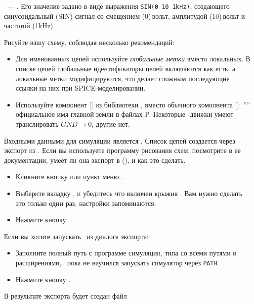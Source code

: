 \ --- . Его значение задано в
виде выражения \verb|SIN(0 10 1kHz)|, создающего синусоидальный (SIN) сигнал со
смещением (0)\,вольт, амплитудой (10)\,вольт и частотой (1kHz).

\bigskip
Рисуйте вашу схему, соблюдая несколько рекомендаций:
\begin{itemize}
  \item
Для именованных цепей используйте \emph{глобальные метки} вместо локальных.
В списке цепей глобальные идентификаторы цепей включаются как есть, а
локальные метки модифицируются, что делает сложным последующие ссылки на них при
SPICE-моделировании.
  \item
Используйте компонент [] из библиотеки , вместо обычного
комопнента []: ”” официальное имя главной земли в файлах
P\spice. Некоторые \spice-движки умеют транслировать $GND \rightarrow 0$, другие
нет.
\end{itemize}


Входными данными для симуляции является .
Список цепей создается через экспорт из \eeschema. Если
вы используете программу рисования схем, посмотрите в ее документации, умеет ли
она экспорт в \spice (), и как это сделать.

\begin{itemize}
  \item
Кликните кнопку или пункт меню .
  \item
Выберите вкладку , и убедитесь что включен крыжик . Вам нужно сделать это только один раз, настройки
запоминаются.
\item
Нажмите кнопку 
\end{itemize}

Если вы хотите запускать \ngs\ из диалога экспорта:
\begin{itemize}
  \item
Заполните полный путь с программе симуляции, типа
 со всеми путями и расширениями, \kicad\ пока не
научился запускать симулятор через \verb|PATH|.
  \item
Нажмите кнопку .
\end{itemize}

\bigskip
В результате экспорта будет создан файл


